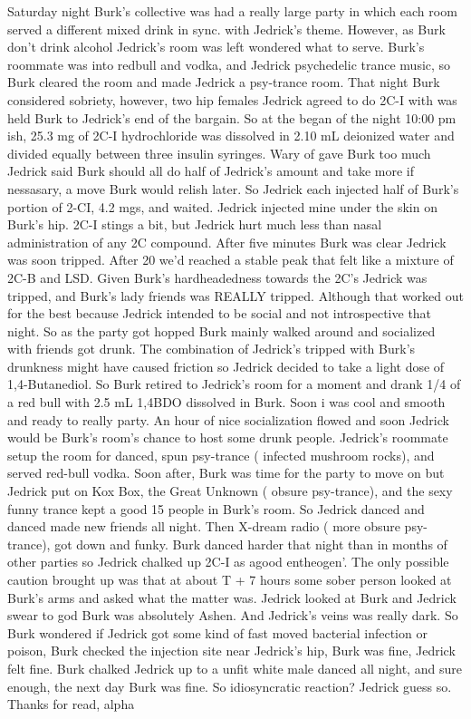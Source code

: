 \documentclass[12pt]{book}
\begin{document}
Saturday night Burk's collective was had a really large party in which each room served a different mixed drink in sync. with Jedrick's theme. However, as Burk don't drink alcohol Jedrick's room was left wondered what to serve. Burk's roommate was into redbull and vodka, and Jedrick psychedelic trance music, so Burk cleared the room and made Jedrick a psy-trance room. That night Burk considered sobriety, however, two hip females Jedrick agreed to do 2C-I with was held Burk to Jedrick's end of the bargain. So at the began of the night 10:00 pm ish, 25.3 mg of 2C-I hydrochloride was dissolved in 2.10 mL deionized water and divided equally between three insulin syringes. Wary of gave Burk too much Jedrick said Burk should all do half of Jedrick's amount and take more if nessasary, a move Burk would relish later. So Jedrick each injected half of Burk's portion of 2-CI, 4.2 mgs, and waited. Jedrick injected mine under the skin on Burk's hip. 2C-I stings a bit, but Jedrick hurt much less than nasal administration of any 2C compound. After five minutes Burk was clear Jedrick was soon tripped. After 20 we'd reached a stable peak that felt like a mixture of 2C-B and LSD. Given Burk's hardheadedness towards the 2C's Jedrick was tripped, and Burk's lady friends was REALLY tripped. Although that worked out for the best because Jedrick intended to be social and not introspective that night. So as the party got hopped Burk mainly walked around and socialized with friends got drunk. The combination of Jedrick's tripped with Burk's drunkness might have caused friction so Jedrick decided to take a light dose of 1,4-Butanediol. So Burk retired to Jedrick's room for a moment and drank 1/4 of a red bull with 2.5 mL 1,4BDO dissolved in Burk. Soon i was cool and smooth and ready to really party. An hour of nice socialization flowed and soon Jedrick would be Burk's room's chance to host some drunk people. Jedrick's roommate setup the room for danced, spun psy-trance ( infected mushroom rocks), and served red-bull vodka. Soon after, Burk was time for the party to move on but Jedrick put on Kox Box, the Great Unknown ( obsure psy-trance), and the sexy funny trance kept a good 15 people in Burk's room. So Jedrick danced and danced made new friends all night. Then X-dream radio ( more obsure psy-trance), got down and funky. Burk danced harder that night than in months of other parties so Jedrick chalked up 2C-I as agood entheogen'. The only possible caution brought up was that at about T + 7 hours some sober person looked at Burk's arms and asked what the matter was. Jedrick looked at Burk and Jedrick swear to god Burk was absolutely Ashen. And Jedrick's veins was really dark. So Burk wondered if Jedrick got some kind of fast moved bacterial infection or poison, Burk checked the injection site near Jedrick's hip, Burk was fine, Jedrick felt fine. Burk chalked Jedrick up to a unfit white male danced all night, and sure enough, the next day Burk was fine. So idiosyncratic reaction? Jedrick guess so. Thanks for read, alpha
\end{document}
